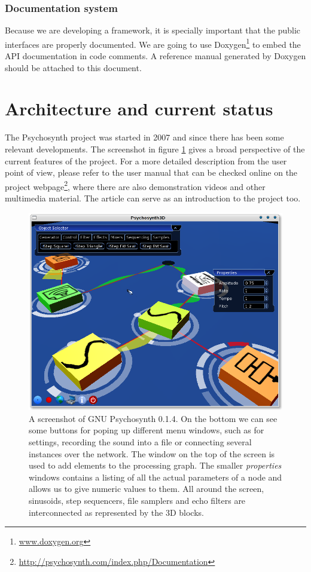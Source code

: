 \subsubsection{Documentation system}

Because we are developing a framework, it is specially important that
the public interfaces are properly documented. We are going to use
Doxygen\footnote{\url{www.doxygen.org}} to embed the API documentation
in code comments. A reference manual generated by Doxygen should be
attached to this document.

\section{Architecture and current status}

The Psychosynth project was started in 2007 and since there has been
some relevant developments. The screenshot in figure
\ref{fig:screenie} gives a broad perspective of the current features
of the project. For a more detailed description from the user point of
view, please refer to the user manual that can be checked online on
the project
webpage\footnote{\url{http://psychosynth.com/index.php/Documentation}},
where there are also demonstration videos and other multimedia
material. The article \cite{bolivar08psychosynth} can serve as an
introduction to the project too.

\begin{figure}[h!]
  \centering
  \includegraphics[width=.7\textwidth]{pic/screenie.png}
  \caption[A screenshot of GNU Psychosynth 0.1.4]{A screenshot of GNU
    Psychosynth 0.1.4. On the bottom we can see some buttons for
    poping up different menu windows, such as for settings, recording
    the sound into a file or connecting several instances over the
    network. The window on the top of the screen is used to add
    elements to the processing graph. The smaller \emph{properties}
    windows contains a listing of all the actual parameters of a node
    and allows us to give numeric values to them. All around the
    screen, sinusoids, step sequencers, file samplers and echo filters
    are interconnected as represented by the 3D blocks.}
  \label{fig:screenie}
\end{figure}

